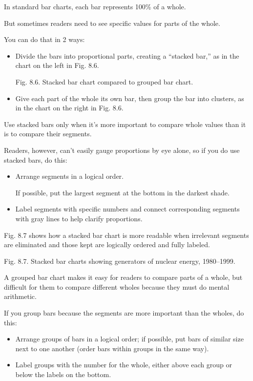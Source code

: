 \documentclass[oneside]{book}
\numberwithin{equation}{section}
\begin{document}
%
In standard bar charts, each bar represents 100\% of a whole.

But sometimes readers need to see specific values for parts of the whole.

You can do that in 2 ways:
\begin{itemize}
    \item Divide the bars into proportional parts, creating a ``stacked bar,'' as in the chart on the left in Fig. 8.6.
    
    \textsf{Fig. 8.6. Stacked bar chart compared to grouped bar chart.}
    \item Give each part of the whole its own bar, then group the bar into clusters, as in the chart on the right in Fig. 8.6.
\end{itemize}
Use stacked bars only when it's more important to compare whole values than it is to compare their segments.

Readers, however, can't easily gauge proportions by eye alone, so if you do use stacked bars, do this:
\begin{itemize}
    \item Arrange segments in a logical order.
    
    If possible, put the largest segment at the bottom in the darkest shade.
    \item Label segments with specific numbers and connect corresponding segments with gray lines to help clarify proportions.
\end{itemize}
Fig. 8.7 shows how a stacked bar chart is more readable when irrelevant segments are eliminated and those kept are logically ordered and fully labeled.

\textsf{Fig. 8.7. Stacked bar charts showing generators of nuclear energy, 1980--1999.}

%
A grouped bar chart makes it easy for readers to compare parts of a whole, but difficult for them to compare different wholes because they must do mental arithmetic.

If you group bars because the segments are more important than the wholes, do this:
\begin{itemize}
    \item Arrange groups of bars in a logical order; if possible, put bars of similar size next to one another (order bars within groups in the same way).
    \item Label groups with the number for the whole, either above each group or below the labels on the bottom.
\end{itemize}
\end{document}

